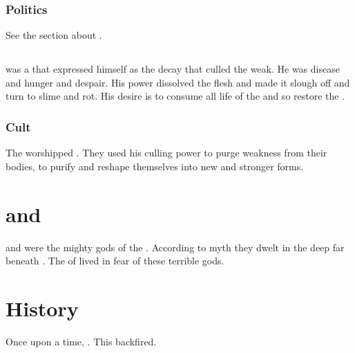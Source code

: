 \subsubsection{Politics}
See the section about .









\subsection{\Yagnathul}
\index{\Yagnathul}
\Yagnathul was a  that expressed himself as the decay that culled the weak. 
He was disease and hunger and despair. 
His power dissolved the flesh and made it slough off and turn to slime and rot. 
His desire is to consume all life of the  and so restore the .





\subsubsection{Cult}
The \aryothim worshipped \Yagnathul.
They used his culling power to purge weakness from their bodies, to purify and reshape themselves into new and stronger forms. 















\section[Norganthus and Tzyaragoth]{\Norganthus and \Tzyaragoth}
\index{\Norganthus}
\index{\Tzyaragoth}
\Norganthus and \Tzyaragoth were the mighty gods of the \umbrae. 
According to \resphan myth they dwelt in the deep far beneath \Nyx. 
The \resphain of \Merkyrah lived in fear of these terrible gods. 









\section{History}
Once upon a time, . 
This backfired. 















